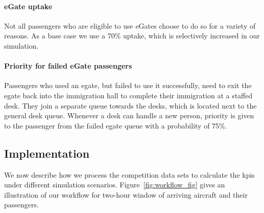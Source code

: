 \documentclass[10pt]{article}
\begin{document}
\paragraph{eGate uptake} 
Not all passengers who are eligible to use eGates choose to do so for a variety of reasons. As a base case we use a 70\% uptake, which is selectively increased in our simulation. 


\paragraph{Priority for failed eGate passengers}
Passengers who used an \gls{egate}, but failed to use it successfully, need to exit the \gls{egate} back into the immigration hall to complete their immigration at a staffed desk. They join a separate queue towards the desks, which is located next to the general desk queue. Whenever a desk can handle a new person, priority is given to the passenger from the failed \gls{egate} queue with a probability of 75\%.


\subsection{Implementation}

We now describe how we process the competition data sets to calculate the \glspl{kpi} under different simulation scenarios. Figure~\ref{fig:workflow_fig} gives an illustration of our workflow for two-hour window of arriving aircraft and their passengers. 
\end{document}
